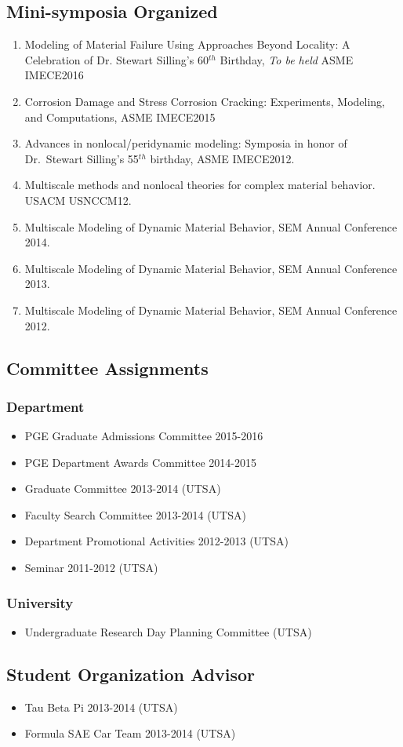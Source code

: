 \subsection*{Mini-symposia Organized}

\begin{enumerate}
    \item Modeling of Material Failure Using Approaches Beyond Locality: A Celebration of Dr. Stewart Silling's 60$^{th}$ Birthday, \emph{To be held} ASME IMECE2016
    \item Corrosion Damage and Stress Corrosion Cracking: Experiments, Modeling, and Computations, ASME IMECE2015
    \item Advances in nonlocal/peridynamic modeling: Symposia in honor of Dr.~Stewart Silling's 55$^{th}$ birthday, ASME IMECE2012.
    \item Multiscale methods and nonlocal theories for complex material behavior. USACM USNCCM12.
    \item Multiscale Modeling of Dynamic Material Behavior, SEM Annual Conference 2014.
    \item Multiscale Modeling of Dynamic Material Behavior, SEM Annual Conference 2013.
    \item Multiscale Modeling of Dynamic Material Behavior, SEM Annual Conference 2012.
\end{enumerate}

\subsection*{Committee Assignments}
\subsubsection*{Department}
\begin{itemize}
    \item PGE Graduate Admissions Committee 2015-2016
    \item PGE Department Awards Committee 2014-2015
    \item Graduate Committee 2013-2014 (UTSA)
    \item Faculty Search Committee 2013-2014 (UTSA)
    \item Department Promotional Activities 2012-2013 (UTSA)
    \item Seminar 2011-2012 (UTSA)
\end{itemize}

\subsubsection*{University}
\begin{itemize}
    \item Undergraduate Research Day Planning Committee (UTSA)
\end{itemize}

\subsection*{Student Organization Advisor}
\begin{itemize}
    \item Tau Beta Pi 2013-2014 (UTSA)
    \item Formula SAE Car Team 2013-2014 (UTSA)
\end{itemize}



